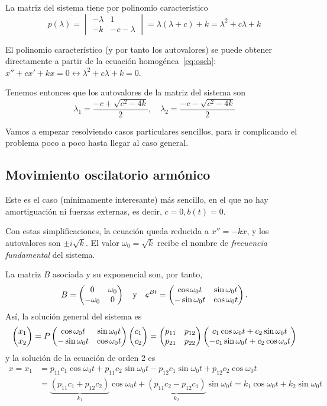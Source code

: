 \documentclass[../ecuaciones_diferenciales.tex]{subfiles}
\begin{document}
La matriz del sistema tiene por polinomio característico
\[
	p(\lambda) =
	\begin{vmatrix}
		-\lambda & 1 \\ -k & -c-\lambda
	\end{vmatrix} =
	\lambda(\lambda + c) + k = \lambda^2 + c\lambda + k
\]
\begin{remark}
	El polinomio característico (y por tanto los autovalores) se puede obtener
	directamente a partir de la ecuación homogénea~\eqref{eq:osch}: \(x'' + cx' +
	kx = 0 \leftrightarrow \lambda^2 + c\lambda + k = 0\).
\end{remark}

Tenemos entonces que los autovalores de la matriz del sistema son
\[\lambda_1 = \frac{-c + \sqrt{c^2 - 4k}}{2}, \quad \lambda_2 = \frac{-c - \sqrt{c^2-4k}}{2}\]

Vamos a empezar resolviendo casos particulares sencillos, para ir complicando el
problema poco a poco hasta llegar al caso general.

\subsection{Movimiento oscilatorio armónico}

Este es el caso (mínimamente interesante) más sencillo, en el que no hay
amortiguación ni fuerzas externas, es decir, \(c = 0, b(t) = 0\).

Con estas simplificaciones, la ecuación queda reducida a \(x'' = -kx\), y los
autovalores son \(\pm i\sqrt{k}\). El valor \(\omega_0 = \sqrt{k}\) recibe el
nombre de \emph{frecuencia fundamental} del sistema.

La matriz \(B\) asociada y su exponencial son, por tanto, 
\[B = \begin{pmatrix}0 & \omega_0 \\ -\omega_0 & 0\end{pmatrix} 
	\quad \text{y} \quad 
	e^{Bt} = \begin{pmatrix}\cos \omega_0 t & \sin \omega_0 t 
	\\ -\sin \omega_0 t & \cos \omega_0 t\end{pmatrix}.\] 
Así, la solución general del sistema es
\[\begin{pmatrix}x_1 \\ x_2\end{pmatrix} = P \begin{pmatrix}\cos \omega_0 t & \sin \omega_0 t
		\\ -\sin \omega_0 t & \cos \omega_0 t\end{pmatrix}\begin{pmatrix}c_1 \\ c_2\end{pmatrix} = \begin{pmatrix}p_{11} & p_{12} \\
		p_{21} & p_{22}\end{pmatrix} \begin{pmatrix}c_1 \cos \omega_0 t + c_2 \sin \omega_0 t \\ -c_1 \sin
		\omega_0 t + c_2 \cos \omega_o t\end{pmatrix}\]
y la solución de la ecuación de orden 2 es
\begin{align*}
	x = x_1 & = p_{11}c_1 \cos \omega_0 t + p_{11}c_2 \sin \omega_0 t - p_{12}c_1
	\sin \omega_0 t + p_{12}c_2 \cos \omega_0 t                                   \\
	        & = \underbrace{(p_{11}c_1+p_{12}c_2)}_{k_1} \cos \omega_0 t +
	\underbrace{(p_{11}c_2 - p_{12}c_1)}_{k_2} \sin \omega_0 t = k_1 \cos \omega_0
	t + k_2 \sin \omega_0 t
\end{align*}
\end{document}
